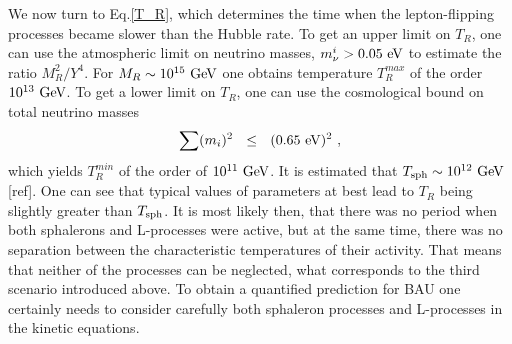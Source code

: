 \documentclass[12pt]{revtex4}
\newcommand{\Tsph}{T_{\rm sph}}
\newcommand{\GeV}{{\rm GeV}}
\newcommand{\eV}{{\rm eV}}
\begin{document}
	We now turn to Eq.\eqref{T_R}, which determines the time when
	the lepton-flipping processes became slower than the Hubble
	rate.
	To get an upper limit on $ T_R $, one can use the atmospheric
	limit on neutrino masses, $ m_\nu^i > 0.05~\eV $ 
	to estimate the ratio $ M_R^2 / Y^4 $.
	For $ M_R \sim 10^{15}~\GeV $ one obtains temperature $ T_R^{max} $ 
	of the order $ 10^{13}~\GeV $.
	To get a lower limit on $ T_R $, one can use the cosmological
	bound on total neutrino masses
\[
	\sum (m_i)^2 ~~\leq~~ (0.65~\eV)^2~,
\]
	which yields $ T_R^{min} $ of the order of $ 10^{11}~\GeV $. 
	It is estimated that $ \Tsph \sim 10^{12}~\GeV $ [ref]. 
	One can see that typical values of parameters at best 
	lead to $ T_R $ being slightly greater than $ \Tsph $.
	It is most likely then, that there was no period when
	both sphalerons and L-processes were active, but at the same
	time, there was no separation between the characteristic 
	temperatures of their activity.
	That means that neither of the processes can be neglected,
	what corresponds to the third scenario introduced above.
	To obtain a quantified prediction for BAU one certainly needs
	to consider carefully both sphaleron processes and L-processes
	in the kinetic equations.
\end{document}
